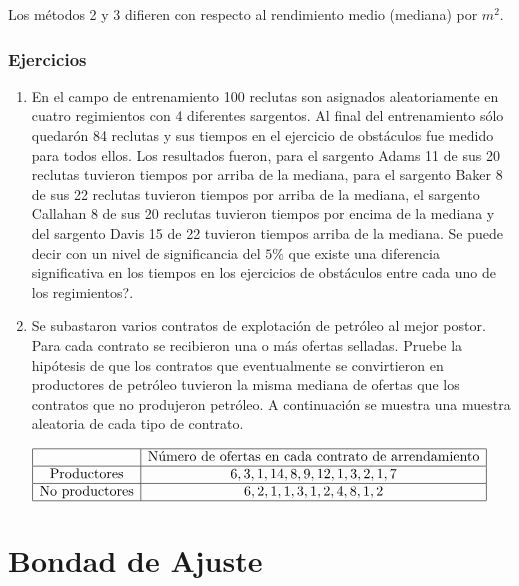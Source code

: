 \documentclass[
  a4paper,
  oneside,
  openany]{book}
\begin{document}
Los métodos 2 y 3 difieren con respecto al rendimiento medio (mediana) por \(m^2\).

\hypertarget{ejercicios-11}{%
\section{Ejercicios}\label{ejercicios-11}}

\begin{enumerate}
\def\labelenumi{\arabic{enumi}.}
\item
  En el campo de entrenamiento 100 reclutas son asignados aleatoriamente en cuatro regimientos con 4 diferentes sargentos. Al final del entrenamiento sólo quedarón 84 reclutas y sus tiempos en el ejercicio de obstáculos fue medido para todos ellos. Los resultados fueron, para el sargento Adams 11 de sus 20 reclutas tuvieron tiempos por arriba de la mediana, para el sargento Baker 8 de sus 22 reclutas tuvieron tiempos por arriba de la mediana, el sargento Callahan 8 de sus 20 reclutas tuvieron tiempos por encima de la mediana y del sargento Davis 15 de 22 tuvieron tiempos arriba de la mediana. Se puede decir con un nivel de significancia del \(5\%\) que existe una diferencia significativa en los tiempos en los ejercicios de obstáculos entre cada uno de los regimientos?.
\item
  Se subastaron varios contratos de explotación de petróleo al mejor postor. Para cada contrato se recibieron una o más ofertas selladas. Pruebe la hipótesis de que los contratos que eventualmente se convirtieron en productores de petróleo tuvieron la misma mediana de ofertas que los contratos que no produjeron petróleo. A continuación se muestra una muestra aleatoria de cada tipo de contrato.
\end{enumerate}

\[
\begin{array}{|c | c |}
\hline
&\mbox{Número de ofertas en cada contrato de arrendamiento} \\
   \hline
\mbox{Productores}& 6, 3, 1, 14, 8, 9, 12, 1, 3, 2, 1, 7  \\
  \hline
\mbox{No  productores}&6, 2, 1, 1, 3, 1, 2, 4, 8, 1, 2\\
    \hline
\end{array}
\]

\hypertarget{part-bondad-de-ajuste}{%
\part{Bondad de Ajuste}\label{part-bondad-de-ajuste}}
\end{document}
